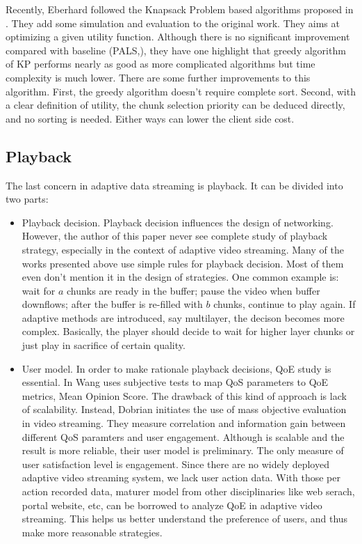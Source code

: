 \documentclass[11pt,a4paper]{article}
\begin{document}
Recently, Eberhard \cite{eberhard2010knapsack} followed the 
Knapsack Problem based algorithms proposed in \cite{szkaliczki2010piece}. 
They add some simulation and evaluation to the original work. 
They aims at optimizing a given utility function. Although there 
is no significant improvement compared with baseline
(PALS,\cite{rejaie2003pals}), they have one highlight that greedy 
algorithm of KP performs nearly as good as more complicated 
algorithms but time complexity is much lower. There are some further 
improvements to this algorithm. First, the greedy algorithm doesn't 
require complete sort. Second, with a clear definition of utility, 
the chunk selection priority can be deduced directly, and no 
sorting is needed. Either ways can lower the client side cost. 

\subsection{Playback}

The last concern in adaptive data streaming is playback. It
can be divided into two parts:
\begin{itemize}
	\item Playback decision. Playback decision influences the design
	of networking. However, the author of this paper never see complete 
	study of playback strategy, especially in the context of adaptive video 
	streaming. Many of the works presented above use simple rules for playback 
	decision. Most of them even don't mention it in the design of strategies. 
	One common example is: wait for $a$ chunks are ready in the buffer; 
	pause the video when buffer downflows; after the buffer is re-filled 
	with $b$ chunks, continue to play again. If adaptive methods are introduced, 
	say multilayer, the decison becomes more complex. Basically, the player 
	should decide to wait for higher layer chunks or just play in sacrifice 
	of certain quality. 
	\item User model. In order to make rationale playback decisions, QoE
	study is essential. In \cite{wang2011-perceptual} Wang uses subjective tests
	to map QoS parameters to QoE metrics, Mean Opinion Score. The drawback 
	of this kind of approach is lack of scalability. Instead, Dobrian
	initiates the use of mass objective evaluation in video
	streaming\cite{dobrian2011understanding}. They measure correlation
	and information gain between different QoS paramters and user 
	engagement. Although \cite{dobrian2011understanding} is scalable 
	and the result is more reliable, their user model is preliminary. 
	The only measure of user satisfaction level is engagement. 
	Since there are no widely deployed adaptive video streaming system, 
	we lack user action data. With those per action recorded data, 
	maturer model from other disciplinaries like web serach, portal 
	website, etc, can be borrowed to analyze QoE in adaptive video 
	streaming. This helps us better understand the preference of users, 
	and thus make more reasonable strategies. 
\end{itemize}
\end{document}
